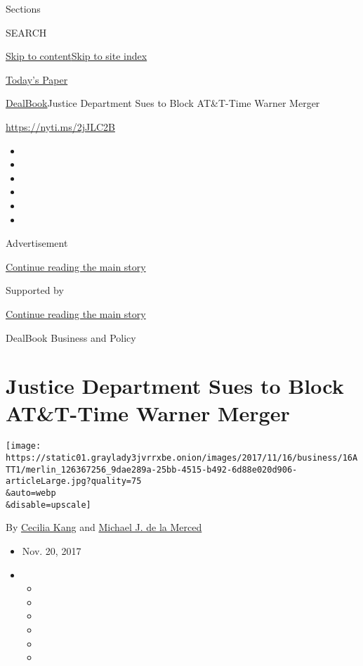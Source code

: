 Sections

SEARCH

\protect\hyperlink{site-content}{Skip to
content}\protect\hyperlink{site-index}{Skip to site index}

\href{https://myaccount.nytimes3xbfgragh.onion/auth/login?response_type=cookie\&client_id=vi}{}

\href{https://www.nytimes3xbfgragh.onion/section/todayspaper}{Today's
Paper}

\href{/section/business/dealbook}{DealBook}\textbar{}Justice Department
Sues to Block AT\&T-Time Warner Merger

\url{https://nyti.ms/2jJLC2B}

\begin{itemize}
\item
\item
\item
\item
\item
\item
\end{itemize}

Advertisement

\protect\hyperlink{after-top}{Continue reading the main story}

Supported by

\protect\hyperlink{after-sponsor}{Continue reading the main story}

DealBook Business and Policy

\hypertarget{justice-department-sues-to-block-att-time-warner-merger}{%
\section{Justice Department Sues to Block AT\&T-Time Warner
Merger}\label{justice-department-sues-to-block-att-time-warner-merger}}

\texttt{[image: https://static01.graylady3jvrrxbe.onion/images/2017/11/16/business/16ATT1/merlin\_126367256\_9dae289a-25bb-4515-b492-6d88e020d906-articleLarge.jpg?quality=75\\\&auto=webp\\\&disable=upscale]}

By \href{http://www.nytimes3xbfgragh.onion/by/cecilia-kang}{Cecilia
Kang} and
\href{http://www.nytimes3xbfgragh.onion/by/michael-j-de-la-merced}{Michael
J. de la Merced}

\begin{itemize}
\item
  Nov. 20, 2017
\item
  \begin{itemize}
  \item
  \item
  \item
  \item
  \item
  \item
  \end{itemize}
\end{itemize}

